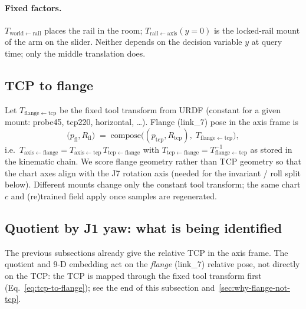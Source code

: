 \documentclass[11pt,a4paper]{article}
\begin{document}
\paragraph{Fixed factors.}
\(T_{\mathrm{world\leftarrow rail}}\) places the rail in the room;
\(T_{\mathrm{rail\leftarrow axis}}(y{=}0)\) is the locked-rail mount of the
arm on the slider. Neither depends on the decision variable \(y\) at query
time; only the middle translation does.

\subsection{TCP to flange}
\label{sec:tcp-flange}

Let \(T_{\mathrm{flange\leftarrow tcp}}\) be the fixed tool transform from
URDF (constant for a given mount: probe45, tcp220, horizontal, \ldots).
Flange (link\_7) pose in the axis frame is
\begin{equation}
\label{eq:tcp-to-flange}
  \bigl(p_{\mathrm{fl}},R_{\mathrm{fl}}\bigr)
  \;=\;
  \mathrm{compose}\bigl(
    (p_{\mathrm{tcp}},R_{\mathrm{tcp}}),\;
    T_{\mathrm{flange\leftarrow tcp}}
  \bigr),
\end{equation}
i.e.\ \(T_{\mathrm{axis\leftarrow flange}}
= T_{\mathrm{axis\leftarrow tcp}}\,
T_{\mathrm{tcp\leftarrow flange}}\) with
\(T_{\mathrm{tcp\leftarrow flange}}
= T_{\mathrm{flange\leftarrow tcp}}^{-1}\) as stored in the kinematic chain.
We score flange geometry rather than TCP geometry so that the chart axes
align with the J7 rotation axis (needed for the invariant / roll split
below). Different mounts change only the constant tool transform; the same
chart \(c\) and (re)trained field apply once samples are regenerated.

\subsection{Quotient by J1 yaw: what is being identified}
\label{sec:quotient}

The previous subsections already give the relative TCP in the axis frame.
The quotient and 9-D embedding act on the \emph{flange} (link\_7) relative
pose, not directly on the TCP: the TCP is mapped through the fixed tool
transform first (Eq.~\eqref{eq:tcp-to-flange}); see the end of this
subsection and~\ref{sec:why-flange-not-tcp}.
\end{document}

